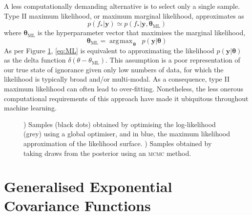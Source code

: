 \documentclass{article}
\newcommand{\vect}[1]{\mathbf{#1}}
\newcommand{\xd}{\vect{x}}
\newcommand{\yd}{\vect{y}}
\renewcommand{\sc}[1]{{\scshape #1}}
\DeclareMathOperator*{\argmax}{\arg\!\max\!}
\begin{document}
A less computationally demanding alternative is to select only a single sample. Type II maximum likelihood, or maximum marginal likelihood, approximates as
\begin{equation} \label{eq:ML}
p(f_* |\yd) \simeq p(f_* | \yd,\bm{\theta}_{\mathrm{ML}})
\end{equation}
where $\bm{\theta}_{\mathrm{ML}}$ is the hyperparameter vector that maximises the marginal likelihood, 
\begin{equation}
\bm{\theta}_{\mathrm{ML}} = \argmax_{\bm{\theta}} \;\; p(\yd|\bm{\theta})
\end{equation}
As per Figure \ref{fig:ML}, \eqref{eq:ML} is equivalent to approximating the likelihood $p(\yd|\bm{\theta})$ as the delta function $\delta(\theta - \theta_{\mathrm{ML}})$. This assumption is a poor representation of our true state of ignorance given only low numbers of data, for which the likelihood is typically broad and/or multi-modal. As a consequence, type II maximum likelihood can often lead to over-fitting. Nonetheless, the less onerous computational requirements of this approach have made it ubiquitous throughout machine learning. 

\begin{figure}
	\begin{subfigure}[b]{7cm}
	  \caption{}
	  \label{fig:ML}
	\end{subfigure}
	\begin{subfigure}[b]{7cm}
	  \caption{}
	  \label{fig:MCMC}
	\end{subfigure}
\caption{) Samples (black dots) obtained by optimising the log-likelihood (grey) using a global optimiser, and in blue, the maximum likelihood approximation of the likelihood surface. ) Samples obtained by taking draws from the posterior using an \sc{mcmc} method.}
\label{fig:periodic_likelihood}
\end{figure}

\section{Generalised Exponential Covariance Functions} 
 
\end{document}
